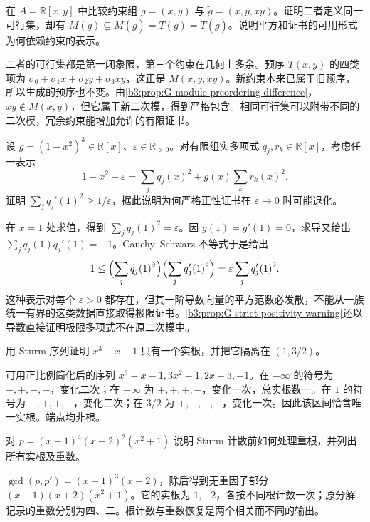 \begin{exercise}\label{b3:ex:G-module-preordering-product}
	在 \(A=\mathbb R[x,y]\) 中比较约束组 \(g=(x,y)\) 与 \(\widetilde g=(x,y,xy)\)。证明二者定义同一可行集，却有 \(M(g)\subsetneq M(\widetilde g)=T(g)=T(\widetilde g)\)。说明平方和证书的可用形式为何依赖约束的表示。
\end{exercise}
\begin{solution}
	二者的可行集都是第一闭象限，第三个约束在几何上多余。预序 \(T(x,y)\) 的四类项为 \(\sigma_0+\sigma_1x+\sigma_2y+\sigma_3xy\)，这正是 \(M(x,y,xy)\)。新约束本来已属于旧预序，所以生成的预序也不变。由\cref{b3:prop:G-module-preordering-difference}，\(xy\notin M(x,y)\)，但它属于新二次模，得到严格包含。相同可行集可以附带不同的二次模，冗余约束能增加允许的有限证书。
\end{solution}

\begin{exercise}\label{b3:ex:G-strict-positivity-warning}
	设 \(g=(1-x^2)^3\in\mathbb R[x]\)、\(\varepsilon\in\mathbb R_{>0}\)。对有限组实多项式 \(q_j,r_k\in\mathbb R[x]\)，考虑任一表示
	\[
		1-x^2+\varepsilon=\sum_jq_j(x)^2+g(x)\sum_kr_k(x)^2.
	\]
	证明 \(\sum_jq_j'(1)^2\ge1/\varepsilon\)，据此说明为何严格正性证书在 \(\varepsilon\to0\) 时可能退化。
\end{exercise}
\begin{solution}
	在 \(x=1\) 处求值，得到 \(\sum_jq_j(1)^2=\varepsilon\)。因 \(g(1)=g'(1)=0\)，求导又给出 \(\sum_jq_j(1)q_j'(1)=-1\)。Cauchy--Schwarz 不等式于是给出
	\[
		1\le\Bigl(\sum_jq_j(1)^2\Bigr)\Bigl(\sum_jq_j'(1)^2\Bigr) =\varepsilon\sum_jq_j'(1)^2.
	\]
	这种表示对每个 \(\varepsilon>0\) 都存在，但其一阶导数向量的平方范数必发散，不能从一族统一有界的这类数据直接取得极限证书。\cref{b3:prop:G-strict-positivity-warning}还以导数直接证明极限多项式不在原二次模中。
\end{solution}

\begin{exercise}\label{b3:ex:G-sturm-cubic}
	用 Sturm 序列证明 \(x^3-x-1\) 只有一个实根，并把它隔离在 \((1,3/2)\)。
\end{exercise}
\begin{solution}
	可用正比例简化后的序列 \(x^3-x-1,3x^2-1,2x+3,-1\)。在 \(-\infty\) 的符号为 \(-,+,-,-\)，变化二次；在 \(+\infty\) 为 \(+,+,+,-\)，变化一次，总实根数一。在 \(1\) 的符号为 \(-,+,+,-\)，变化二次；在 \(3/2\) 为 \(+,+,+,-\)，变化一次。因此该区间恰含唯一实根。端点均非根。
\end{solution}

\begin{exercise}\label{b3:ex:G-repeated-roots}
	对 \(p=(x-1)^4(x+2)^2(x^2+1)\) 说明 Sturm 计数前如何处理重根，并列出所有实根及重数。
\end{exercise}
\begin{solution}
	\(\gcd(p,p')=(x-1)^3(x+2)\)，除后得到无重因子部分 \((x-1)(x+2)(x^2+1)\)。它的实根为 \(1,-2\)，各按不同根计数一次；原分解记录的重数分别为四、二。根计数与重数恢复是两个相关而不同的输出。
\end{solution}

